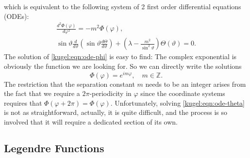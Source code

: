 which is equivalent to the following system of 2 first order differential
equations (ODEs):
\begin{subequations}
  \begin{gather}
    \frac{d^2\Phi(\varphi)}{d\varphi^2} = -m^2 \Phi(\varphi),
      \label{kugel:eqn:ode-phi} \\ 
    \sin \vartheta \frac{d}{d \vartheta} \left(
      \sin \vartheta \frac{d \Theta}{d \vartheta}
    \right)
    + \left( \lambda - \frac{m^2}{\sin^2 \vartheta} \right)
      \Theta(\vartheta) = 0
      \label{kugel:eqn:ode-theta}.
  \end{gather}
\end{subequations}
The solution of \eqref{kugel:eqn:ode-phi} is easy to find: The complex
exponential is obviously the function we are looking for. So we can directly
write the solutions
\begin{equation} \label{kugel:eqn:ode-phi-sol}
    \Phi(\varphi) = e^{i m \varphi}, \quad m \in \mathbb{Z}.
\end{equation}
The restriction that the separation constant $m$ needs to be an integer arises
from the fact that we require a $2\pi$-periodicity in $\varphi$ since the
coordinate systems requires that $\Phi(\varphi + 2\pi) = \Phi(\varphi)$.
Unfortunately, solving \eqref{kugel:eqn:ode-theta} is not as straightforward,
actually, it is quite difficult, and the process is so involved that it will
require a dedicated section of its own.

\subsection{Legendre Functions}

\begin{figure}
  \centering
  \caption{
  }
\end{figure}

